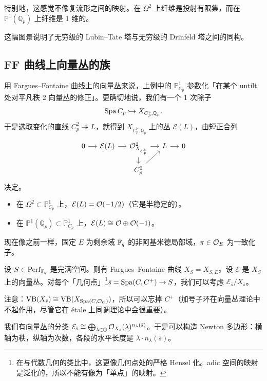 特别地，这感觉不像复流形之间的映射。在 $\Omega^2$ 上纤维是投射有限集，而在 $\mathbb{P}^1(\mathbb{Q}_p)$ 上纤维是 1 维的。

\begin{remark}
这幅图景说明了无穷级的 Lubin--Tate 塔与无穷级的 Drinfeld 塔之间的同构。
\end{remark}

\begin{center}
\end{center}

\subsection{FF 曲线上向量丛的族}

用 Fargues--Fontaine 曲线上的向量丛来说，上例中的 $\mathbb{P}^1_{C_p}$ 参数化「在某个 untilt 处对平凡秩 2 向量丛的修正」。更确切地说，我们有一个 1 次除子
\[
\operatorname{Spa} C_p\hookrightarrow X_{C_p^\flat,\mathbb{Q}_p}.
\]
于是选取变化的直线 $C_p^2\twoheadrightarrow L$，就得到 $X_{C_p^\flat,\mathbb{Q}_p}$ 上的丛 $\mathcal{E}(L)$，由短正合列
\[
\begin{tikzcd}[column sep=small,row sep=small]
0 \arrow[r] & \mathcal{E}(L) \arrow[r] & \cO^2_{X_{C_p^\flat}} \arrow[r] \arrow[d] & L \arrow[r] & 0\\
& & C_p^2 \arrow[ur] & &
\end{tikzcd}
\]
决定。
\begin{itemize}
  \item 在 $\Omega^2\subset\mathbb{P}^1_{C_p}$ 上，$\mathcal{E}(L)=\mathcal{O}(-1/2)$（它是半稳定的）。
  \item 在 $\mathbb{P}^1(\mathbb{Q}_p)\subset\mathbb{P}^1_{C_p}$ 上，$\mathcal{E}(L)\cong\mathcal{O}\oplus\mathcal{O}(-1)$。
\end{itemize}

现在像之前一样，固定 $E$ 为剩余域 $\mathbb{F}_q$ 的非阿基米德局部域，$\pi\in\mathcal{O}_E$ 为一致化子。

设 $S\in\mathrm{Perf}_{\mathbb{F}_q}$ 是完满空间。则有 Fargues--Fontaine 曲线 $X_S=X_{S,E}$。设 $\mathcal{E}$ 是 $X_S$ 上的向量丛。对每个「几何点」\footnote{在与代数几何的类比中，这更像几何点处的严格 Hensel 化。adic 空间的映射是泛化的，所以不能有像为「单点」的映射。}$\bar{s}=\operatorname{Spa}(C,C^+)\to S$，我们可以考虑 $\mathcal{E}_{\bar{s}}/X_{\bar{s}}$。

注意：$\mathrm{VB}(X_{\bar{s}})\cong\mathrm{VB}(X_{\operatorname{Spa}(C,\mathcal{O}_C)})$，所以可以忘掉 $C^+$（加号子环在向量丛理论中不起作用，尽管它在 étale 上同调理论中会很重要）。

我们有向量丛的分类 $\mathcal{E}_{\bar{s}}\cong\bigoplus_{\lambda\in\mathbb{Q}}\mathcal{O}_{X_{\bar{s}}}(\lambda)^{n_\lambda(\bar{s})}$。于是可以构造 Newton 多边形：横轴为秩，纵轴为次数，各段的水平长度是 $\lambda\cdot n_\lambda(\bar{s})$。

